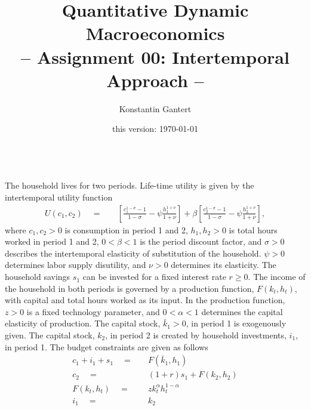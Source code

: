 \documentclass[a4paper, 12pt]{article}
\title{Quantitative Dynamic Macroeconomics \vspace{0.1in} \\ \large{-- Assignment 00: Intertemporal Approach --}}
\author{\small{Konstantin Gantert}}
\date{\small{this version: \today}}
\begin{document}
%
\clearpage\maketitle %
%
\noindent{}%
\vspace*{0.25in}\\%
The household lives for two periods. Life-time utility is given by the intertemporal utility function
\begin{align*}%
	U\left(c_1,c_2\right) \quad = & \quad \left[ \frac{c_1^{1-\sigma}-1}{1-\sigma} - \psi \frac{h_1^{1+\nu}}{1+\nu} \right] + \beta \left[ \frac{c_2^{1-\sigma}-1}{1-\sigma} - \psi \frac{h_2^{1+\nu}}{1+\nu} \right],%
\end{align*}%
where $c_1,c_2>0$ is consumption in period 1 and 2, $h_1,h_2>0$ is total hours worked in period 1 and 2, $0<\beta< 1$ is the period discount factor, and $\sigma>0$ describes the intertemporal elasticity of substitution of the household. $\psi>0$ determines labor supply disutility, and $\nu>0$ determines its elasticity. The household savings $s_1$ can be invested for a fixed interest rate $r\geq0$. The income of the household in both periods is governed by a production function, $F(k_t,h_t)$, with capital and total hours worked as its input. In the production function, $z>0$ is a fixed technology parameter, and $0<\alpha<1$ determines the capital elasticity of production. The capital stock, $\bar{k}_1>0$, in period 1 is exogenously given. The capital stock, $k_2$, in period 2 is created by household investments, $i_1$, in period 1. The budget constraints are given as follows%
\begin{align*}%
	c_1 + i_1 + s_1 \quad = & \quad F(\bar{k}_1,h_1) \\%
	c_2 \quad = & \quad \left(1+r\right) s_1 + F(k_2,h_2) \\%
	F(k_t,h_t) \quad = & \quad z k_t^\alpha h_t^{1-\alpha}\\
	i_1 \quad = & \quad k_2%
\end{align*}\\%
\end{document}
